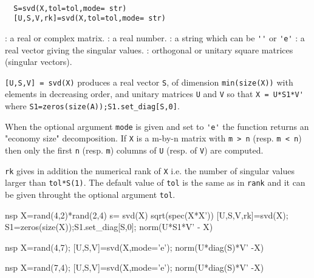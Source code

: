\begin{mandesc}
   \\ %
\end{mandesc}
\begin{calling_sequence}
\begin{verbatim}
  S=svd(X,tol=tol,mode= str)  
  [U,S,V,rk]=svd(X,tol=tol,mode= str)  
\end{verbatim}
\end{calling_sequence}
\begin{parameters}
  \begin{varlist}
    : a real or complex matrix.
    : a real number.
    : a string which can be \verb!''! or \verb!'e'!
    : a real vector giving the singular values.
    : orthogonal or unitary square matrices (singular vectors).
  \end{varlist}
\end{parameters}
\begin{mandescription}
  \verb![U,S,V] = svd(X)! produces a real vector \verb!S!, of dimension 
  \verb!min(size(X))! with elements in decreasing order, and unitary matrices
  \verb!U! and \verb!V! so that \verb!X = U*S1*V'! where 
  \verb!S1=zeros(size(A));S1.set_diag[S,0]!. 
  
  When the optional argument \verb!mode! is given and set to \verb!'e'! 
  the function returns an "economy size" decomposition. 
  If \verb!X! is a m-by-n matrix with \verb!m > n! (resp. \verb!m < n!) 
  then only the first \verb!n! (resp. \verb!m!) 
  columns of \verb!U! (resp. of \verb!V!) are computed. 

  \verb!rk! gives in addition the numerical rank of \verb!X! i.e. the number of
  singular values larger than \verb!tol*S(1)!. The default value of \verb!tol!  is
  the same as in \verb!rank! and it can be given throught the optional argument
  \verb!tol!.
\end{mandescription}
\begin{examples}
  \begin{mintednsp}{nsp}
    X=rand(4,2)*rand(2,4)
    s= svd(X)
    sqrt(spec(X*X'))
    [U,S,V,rk]=svd(X);
    S1=zeros(size(X));S1.set_diag[S,0];
    norm(U*S1*V' - X)
  \end{mintednsp}
  \begin{mintednsp}{nsp}
    X=rand(4,7);
    [U,S,V]=svd(X,mode='e');
    norm(U*diag(S)*V' -X) 
  \end{mintednsp}
  \begin{mintednsp}{nsp}
    X=rand(7,4);
    [U,S,V]=svd(X,mode='e');
    norm(U*diag(S)*V' -X) 
  \end{mintednsp}
\end{examples}
\begin{manseealso}
         
\end{manseealso}

